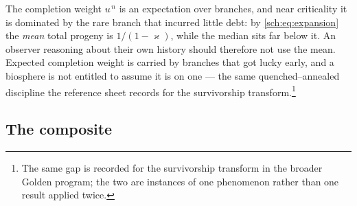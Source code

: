 \begin{remark}\label{sch:rem:gap2}
The completion weight $u^{\,n}$ is an expectation over branches, and
near criticality it is dominated by the rare branch that incurred little
debt: by \eqref{sch:eq:expansion} the \emph{mean} total progeny is
$1/(1-\varkappa)$, while the median sits far below it. An observer reasoning
about their own history should therefore not use the mean. Expected
completion weight is carried by branches that got lucky early, and a
biosphere is not entitled to assume it is on one --- the same
quenched--annealed discipline the reference sheet records for the
survivorship transform.\footnote{The same gap is recorded for the survivorship transform in the broader Golden program; the two are instances of one phenomenon rather than one result applied twice.}
\end{remark}

\subsection{The composite}\label{sch:subsub:composite}

